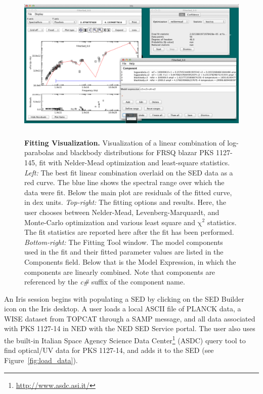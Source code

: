 \documentclass[preprint,authoryear,5p]{elsarticle}
\begin{document}
\begin{figure} \centering
\includegraphics[height=2.95in,width=5.3in]{fitting-1.pdf}
\caption{\textbf{Fitting Visualization.}  Visualization of a linear combination of
log-parabolas and blackbody distributions for FRSQ blazar PKS 1127-145, fit with
Nelder-Mead optimization and least-square statistics. \textit{Left:} The best fit
linear combination overlaid on the SED data as a red curve. The blue line shows
the spectral range over which the data were fit. Below the main plot are
residuals of the fitted curve, in dex units. \textit{Top-right:} The fitting
options and results. Here, the user chooses between Nelder-Mead,
Levenberg-Marquardt, and Monte-Carlo \citep[Differential Evolution, ][]{Storn:1997:DEN:596061.596146}
optimization and various least square and
$\mathrm{\chi}^{2}$ statistics. The fit statistics are reported here after the
fit has been performed. \textit{Bottom-right:} The Fitting Tool window. The
model components used in the fit and their fitted parameter values are listed in
the Components field. Below that is the Model Expression, in which the
components are linearly combined. Note that components are referenced by the
\textit{c\#} suffix of the component name.} \label{fig:fitting1} \end{figure}

\begin{sloppypar}
An Iris session begins with populating a SED by clicking on the SED Builder icon on the
Iris desktop. A user loads a local ASCII file of
PLANCK data, a WISE dataset from TOPCAT \citep[ascl:1101.010\footnote{ascl: Astronomy Source Code Library}]{2005ASPC..347...29T} 
through a SAMP message, and all data associated with PKS 1127-14 in NED with the NED SED
Service portal. The user also uses the built-in Italian Space Agency Science Data
Center\footnote{\url{http://www.asdc.asi.it/}} (ASDC) query tool to find
optical/UV data for PKS 1127-14, and adds it to the SED (see
Figure~\ref{fig:load_data}).
\end{sloppypar}
\end{document}
